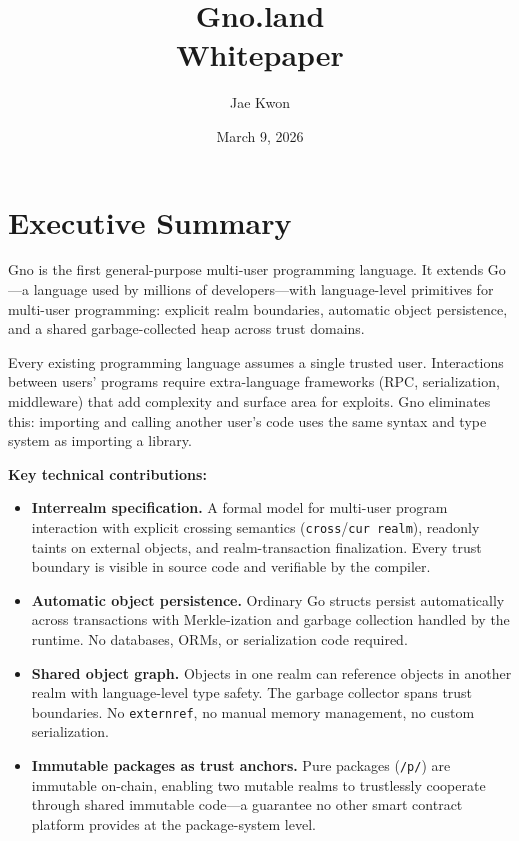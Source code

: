 \documentclass[12pt,a4paper]{article}
\title{\Huge\textbf{Gno.land} \\ \Large Whitepaper}
\author{Jae Kwon}
\date{March 9, 2026}
\newcommand{\passthrough}[1]{#1}
\begin{document}
\maketitle
\tableofcontents
\newpage

\section{Executive Summary}\label{executive-summary}

Gno is the first general-purpose multi-user programming language. It
extends Go---a language used by millions of developers---with
language-level primitives for multi-user programming: explicit realm
boundaries, automatic object persistence, and a shared garbage-collected
heap across trust domains.

Every existing programming language assumes a single trusted user.
Interactions between users' programs require extra-language frameworks
(RPC, serialization, middleware) that add complexity and surface area
for exploits. Gno eliminates this: importing and calling another user's
code uses the same syntax and type system as importing a library.

\textbf{Key technical contributions:}

\begin{itemize}
\item
  \textbf{Interrealm specification.} A formal model for multi-user
  program interaction with explicit crossing semantics
  (\passthrough{\lstinline!cross!}/\passthrough{\lstinline!cur realm!}),
  readonly taints on external objects, and realm-transaction
  finalization. Every trust boundary is visible in source code and
  verifiable by the compiler.
\item
  \textbf{Automatic object persistence.} Ordinary Go structs persist
  automatically across transactions with Merkle-ization and garbage
  collection handled by the runtime. No databases, ORMs, or
  serialization code required.
\item
  \textbf{Shared object graph.} Objects in one realm can reference
  objects in another realm with language-level type safety. The garbage
  collector spans trust boundaries. No
  \passthrough{\lstinline!externref!}, no manual memory management, no
  custom serialization.
\item
  \textbf{Immutable packages as trust anchors.} Pure packages
  (\passthrough{\lstinline!/p/!}) are immutable on-chain, enabling two
  mutable realms to trustlessly cooperate through shared immutable
  code---a guarantee no other smart contract platform provides at the
  package-system level.
\end{itemize}
\end{document}
